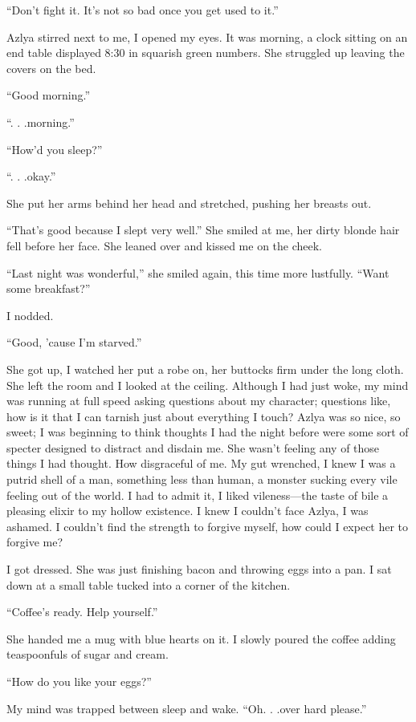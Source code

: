 ``Don't fight it. It's not so bad once you get used to it.''

Azlya stirred next to me, I opened my eyes. It was morning, a clock
sitting on an end table displayed 8:30 in squarish green numbers. She
struggled up leaving the covers on the bed.

``Good morning.''

``. . .morning.''

``How'd you sleep?''

``. . .okay.''

She put her arms behind her head and stretched, pushing her breasts out.

``That's good because I slept very well.'' She smiled at me, her dirty
blonde hair fell before her face. She leaned over and kissed me on the
cheek.

``Last night was wonderful,'' she smiled again, this time more
lustfully. ``Want some breakfast?''

I nodded.

``Good, 'cause I'm starved.''

She got up, I watched her put a robe on, her buttocks firm under the
long cloth. She left the room and I looked at the ceiling. Although I
had just woke, my mind was running at full speed asking questions about
my character; questions like, how is it that I can tarnish just about
everything I touch? Azlya was so nice, so sweet; I was beginning to
think thoughts I had the night before were some sort of specter designed
to distract and disdain me. She wasn't feeling any of those things I had
thought. How disgraceful of me. My gut wrenched, I knew I was a putrid
shell of a man, something less than human, a monster sucking every vile
feeling out of the world. I had to admit it, I liked vileness---the
taste of bile a pleasing elixir to my hollow existence. I knew I
couldn't face Azlya, I was ashamed. I couldn't find the strength to
forgive myself, how could I expect her to forgive me?

I got dressed. She was just finishing bacon and throwing eggs into a
pan. I sat down at a small table tucked into a corner of the kitchen.

``Coffee's ready. Help yourself.''

She handed me a mug with blue hearts on it. I slowly poured the coffee
adding teaspoonfuls of sugar and cream.

``How do you like your eggs?''

My mind was trapped between sleep and wake. ``Oh. . .over hard please.''

